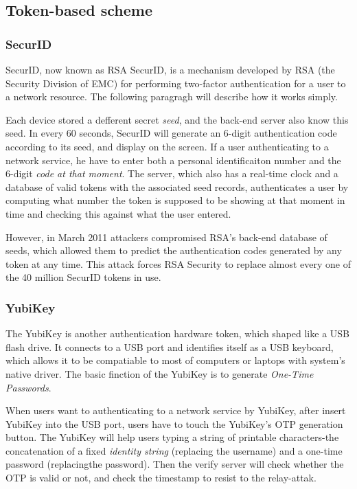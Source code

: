 \begin{CJK}{Bg5}{bsmi}
\subsection{Token-based scheme}

\subsubsection{SecurID}

SecurID, now known as RSA SecurID, is a mechanism developed by RSA (the Security Division of EMC) for performing two-factor authentication for a user to a network resource. The following paragragh will describe how it works simply.

Each device stored a defferent secret \emph{seed}, and the back-end server also know this seed. In every 60 seconds, SecurID will generate an 6-digit authentication code according to its seed, and display on the screen. If a user authenticating to a network service, he have to enter both a personal identificaiton number and the 6-digit \emph{code at that moment}. The server, which also has a real-time clock and a database of valid tokens with the associated seed records, authenticates a user by computing what number the token is supposed to be showing at that moment in time and checking this against what the user entered.

However, in March 2011 attackers compromised RSA's back-end database of seeds, which allowed them to predict the authentication codes generated by any token at any time. This attack forces RSA Security to replace almost every one of the 40 million SecurID tokens in use.

\subsubsection{YubiKey}

The YubiKey is another authentication hardware token, which shaped like a USB flash drive. It connects to a USB port and identifies itself as a USB keyboard, which allows it to be compatiable to most of computers or laptops with system's native driver. The basic finction of the YubiKey is to generate \emph{One-Time Passwords}. 

When users want to authenticating to a network service by YubiKey, after insert YubiKey into the USB port, users have to touch the YubiKey's OTP generation button. The YubiKey will help users typing a string of printable characters-the concatenation of a fixed \emph{identity string} (replacing the username) and a one-time password (replacingthe password). Then the verify server will check whether the OTP is valid or not, and check the timestamp to resist to the relay-attak.


\end{CJK}
